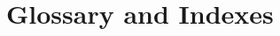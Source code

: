\backmatter

\part*{Glossary and Indexes}
\pagestyle{empty}

\renewcommand{\nomname}{Glossary of Terms}
\printnomenclature
\cleardoublepage

\printindex[tech]
\cleardoublepage

\printindex[subject]
\cleardoublepage


